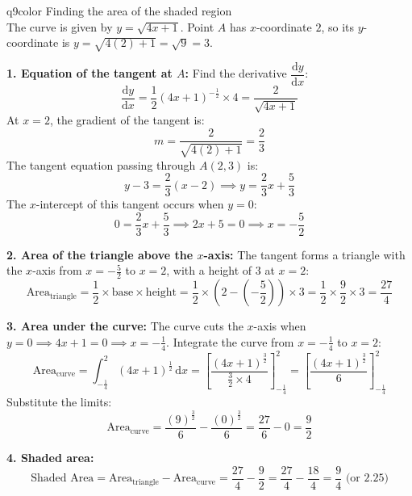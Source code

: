 \documentclass[11pt,a4paper]{article}
\newcommand{\dd}{\mathrm{d}}
\newcommand{\dydx}{\dfrac{\dd y}{\dd x}}
\begin{document}
\begin{ansbox}{q9color}
Finding the area of the shaded region\\[4pt]
The curve is given by $y = \sqrt{4x+1}$. Point $A$ has $x$-coordinate $2$, so its $y$-coordinate is $y = \sqrt{4(2)+1} = \sqrt{9} = 3$. 

\textbf{1. Equation of the tangent at $A$:}
Find the derivative $\dydx$:
\[
\dydx = \frac{1}{2}(4x+1)^{-\frac{1}{2}} \times 4 = \frac{2}{\sqrt{4x+1}}
\]
At $x = 2$, the gradient of the tangent is:
\[
m = \frac{2}{\sqrt{4(2)+1}} = \frac{2}{3}
\]
The tangent equation passing through $A(2,3)$ is:
\[
y - 3 = \frac{2}{3}(x - 2) \implies y = \frac{2}{3}x + \frac{5}{3}
\]
The $x$-intercept of this tangent occurs when $y = 0$:
\[
0 = \frac{2}{3}x + \frac{5}{3} \implies 2x + 5 = 0 \implies x = -\frac{5}{2}
\]

\textbf{2. Area of the triangle above the $x$-axis:}
The tangent forms a triangle with the $x$-axis from $x = -\frac{5}{2}$ to $x = 2$, with a height of $3$ at $x = 2$:
\[
\text{Area}_{\text{triangle}} = \frac{1}{2} \times \text{base} \times \text{height} = \frac{1}{2} \times \left(2 - \left(-\frac{5}{2}\right)\right) \times 3 = \frac{1}{2} \times \frac{9}{2} \times 3 = \frac{27}{4}
\]

\textbf{3. Area under the curve:}
The curve cuts the $x$-axis when $y = 0 \implies 4x + 1 = 0 \implies x = -\frac{1}{4}$. Integrate the curve from $x = -\frac{1}{4}$ to $x = 2$:
\[
\text{Area}_{\text{curve}} = \int_{-\frac{1}{4}}^{2} (4x+1)^{\frac{1}{2}} \,\dd x = \left[ \frac{(4x+1)^{\frac{3}{2}}}{\frac{3}{2} \times 4} \right]_{-\frac{1}{4}}^{2} = \left[ \frac{(4x+1)^{\frac{3}{2}}}{6} \right]_{-\frac{1}{4}}^{2}
\]
Substitute the limits:
\[
\text{Area}_{\text{curve}} = \frac{(9)^{\frac{3}{2}}}{6} - \frac{(0)^{\frac{3}{2}}}{6} = \frac{27}{6} - 0 = \frac{9}{2}
\]

\textbf{4. Shaded area:}
\[
\text{Shaded Area} = \text{Area}_{\text{triangle}} - \text{Area}_{\text{curve}} = \frac{27}{4} - \frac{9}{2} = \frac{27}{4} - \frac{18}{4} = \boxed{\frac{9}{4} \text{ (or } 2.25\text{)}}
\]
\end{ansbox}
\end{document}
